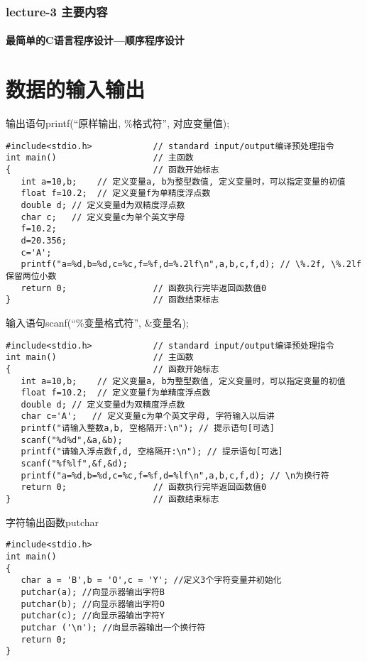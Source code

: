 \begin{frame}
  \frametitle{lecture-3 主要内容}
  \framesubtitle{最简单的C语言程序设计---顺序程序设计}
  \tableofcontents[hideallsubsections]
\end{frame}

\section{数据的输入输出}

\begin{frame}[fragile]{输出语句printf(``原样输出, \%格式符'', 对应变量值);}
\begin{lstlisting}
#include<stdio.h>            // standard input/output编译预处理指令
int main()                   // 主函数
{                            // 函数开始标志
   int a=10,b;    // 定义变量a, b为整型数值, 定义变量时，可以指定变量的初值
   float f=10.2;  // 定义变量f为单精度浮点数
   double d; // 定义变量d为双精度浮点数
   char c;   // 定义变量c为单个英文字母
   f=10.2;
   d=20.356;
   c='A';
   printf("a=%d,b=%d,c=%c,f=%f,d=%.2lf\n",a,b,c,f,d); // \%.2f, \%.2lf保留两位小数
   return 0;                 // 函数执行完毕返回函数值0
}                            // 函数结束标志
\end{lstlisting}
\end{frame}

\begin{frame}[fragile]{输入语句scanf(``\%变量格式符'', \&变量名);}
\begin{lstlisting}
#include<stdio.h>            // standard input/output编译预处理指令
int main()                   // 主函数
{                            // 函数开始标志
   int a=10,b;    // 定义变量a, b为整型数值, 定义变量时，可以指定变量的初值
   float f=10.2;  // 定义变量f为单精度浮点数
   double d; // 定义变量d为双精度浮点数
   char c='A';   // 定义变量c为单个英文字母, 字符输入以后讲
   printf("请输入整数a,b, 空格隔开:\n"); // 提示语句[可选]
   scanf("%d%d",&a,&b);
   printf("请输入浮点数f,d, 空格隔开:\n"); // 提示语句[可选]
   scanf("%f%lf",&f,&d);
   printf("a=%d,b=%d,c=%c,f=%f,d=%lf\n",a,b,c,f,d); // \n为换行符
   return 0;                 // 函数执行完毕返回函数值0
}                            // 函数结束标志
\end{lstlisting}
\end{frame}

\begin{frame}[fragile]{字符输出函数putchar}
\begin{lstlisting}
#include<stdio.h>
int main()
{
   char a = 'B',b = 'O',c = 'Y'; //定义3个字符变量并初始化
   putchar(a); //向显示器输出字符B
   putchar(b); //向显示器输出字符O
   putchar(c); //向显示器输出字符Y
   putchar ('\n'); //向显示器输出一个换行符
   return 0;
}
\end{lstlisting}
\end{frame}

